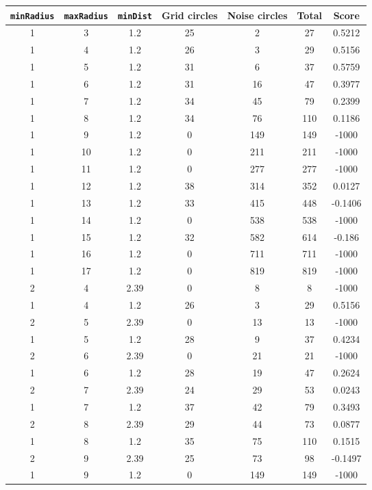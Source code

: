 \documentclass[letterpaper, 12pt]{article}
\begin{document}
\begin{longtable}{|c|c|c|c|c|c|c|}
\hline
\textbf{\texttt{minRadius}} & \textbf{\texttt{maxRadius}} & \textbf{\texttt{minDist}} & \textbf{Grid circles} & \textbf{Noise circles} & \textbf{Total} & \textbf{Score} \\
\hline
1 & 3 & 1.2 & 25 & 2 & 27 & 0.5212 \\
\hline
1 & 4 & 1.2 & 26 & 3 & 29 & 0.5156 \\
\hline
1 & 5 & 1.2 & 31 & 6 & 37 & 0.5759 \\
\hline
1 & 6 & 1.2 & 31 & 16 & 47 & 0.3977 \\
\hline
1 & 7 & 1.2 & 34 & 45 & 79 & 0.2399 \\
\hline
1 & 8 & 1.2 & 34 & 76 & 110 & 0.1186 \\
\hline
1 & 9 & 1.2 & 0 & 149 & 149 & -1000 \\
\hline
1 & 10 & 1.2 & 0 & 211 & 211 & -1000 \\
\hline
1 & 11 & 1.2 & 0 & 277 & 277 & -1000 \\
\hline
1 & 12 & 1.2 & 38 & 314 & 352 & 0.0127 \\
\hline
1 & 13 & 1.2 & 33 & 415 & 448 & -0.1406 \\
\hline
1 & 14 & 1.2 & 0 & 538 & 538 & -1000 \\
\hline
1 & 15 & 1.2 & 32 & 582 & 614 & -0.186 \\
\hline
1 & 16 & 1.2 & 0 & 711 & 711 & -1000 \\
\hline
1 & 17 & 1.2 & 0 & 819 & 819 & -1000 \\
\hline
2 & 4 & 2.39 & 0 & 8 & 8 & -1000 \\
\hline
1 & 4 & 1.2 & 26 & 3 & 29 & 0.5156 \\
\hline
2 & 5 & 2.39 & 0 & 13 & 13 & -1000 \\
\hline
1 & 5 & 1.2 & 28 & 9 & 37 & 0.4234 \\
\hline
2 & 6 & 2.39 & 0 & 21 & 21 & -1000 \\
\hline
1 & 6 & 1.2 & 28 & 19 & 47 & 0.2624 \\
\hline
2 & 7 & 2.39 & 24 & 29 & 53 & 0.0243 \\
\hline
1 & 7 & 1.2 & 37 & 42 & 79 & 0.3493 \\
\hline
2 & 8 & 2.39 & 29 & 44 & 73 & 0.0877 \\
\hline
1 & 8 & 1.2 & 35 & 75 & 110 & 0.1515 \\
\hline
2 & 9 & 2.39 & 25 & 73 & 98 & -0.1497 \\
\hline
1 & 9 & 1.2 & 0 & 149 & 149 & -1000 \\

\end{longtable}
\end{document}
